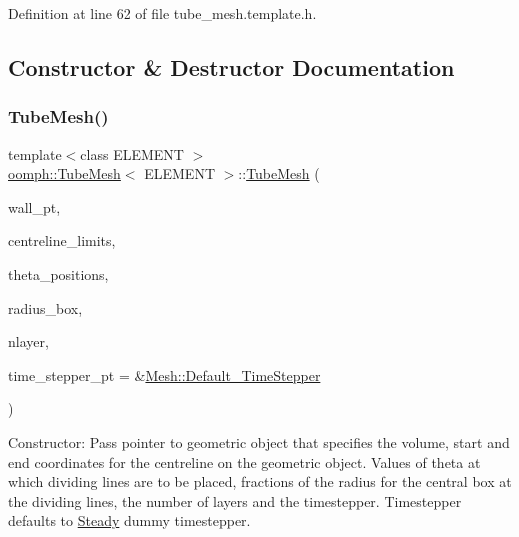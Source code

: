 Definition at line 62 of file tube\+\_\+mesh.\+template.\+h.



\subsection{Constructor \& Destructor Documentation}
\mbox{\label{classoomph_1_1TubeMesh_a6c2aaa81de6298a3f3a7bf1ae4d2b11d}} 
\subsubsection{\texorpdfstring{Tube\+Mesh()}{TubeMesh()}}
{\footnotesize\ttfamily template$<$class E\+L\+E\+M\+E\+NT $>$ \\
\hyperlink{classoomph_1_1TubeMesh}{oomph\+::\+Tube\+Mesh}$<$ E\+L\+E\+M\+E\+NT $>$\+::\hyperlink{classoomph_1_1TubeMesh}{Tube\+Mesh} (\begin{DoxyParamCaption}\item[{\hyperlink{classoomph_1_1GeomObject}{Geom\+Object} $\ast$}]{wall\+\_\+pt,  }\item[{const \hyperlink{classoomph_1_1Vector}{Vector}$<$ double $>$ \&}]{centreline\+\_\+limits,  }\item[{const \hyperlink{classoomph_1_1Vector}{Vector}$<$ double $>$ \&}]{theta\+\_\+positions,  }\item[{const \hyperlink{classoomph_1_1Vector}{Vector}$<$ double $>$ \&}]{radius\+\_\+box,  }\item[{const unsigned \&}]{nlayer,  }\item[{\hyperlink{classoomph_1_1TimeStepper}{Time\+Stepper} $\ast$}]{time\+\_\+stepper\+\_\+pt = {\ttfamily \&\hyperlink{classoomph_1_1Mesh_a12243d0fee2b1fcee729ee5a4777ea10}{Mesh\+::\+Default\+\_\+\+Time\+Stepper}} }\end{DoxyParamCaption})}



Constructor\+: Pass pointer to geometric object that specifies the volume, start and end coordinates for the centreline on the geometric object. Values of theta at which dividing lines are to be placed, fractions of the radius for the central box at the dividing lines, the number of layers and the timestepper. Timestepper defaults to \hyperlink{classoomph_1_1Steady}{Steady} dummy timestepper. 

